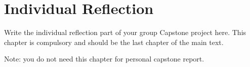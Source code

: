 
\chapter{Individual Reflection}

Write the individual reflection part of your group Capstone project here.
This chapter is compulsory and should be the last chapter of the main text.

Note: you do not need this chapter for personal capstone report.
